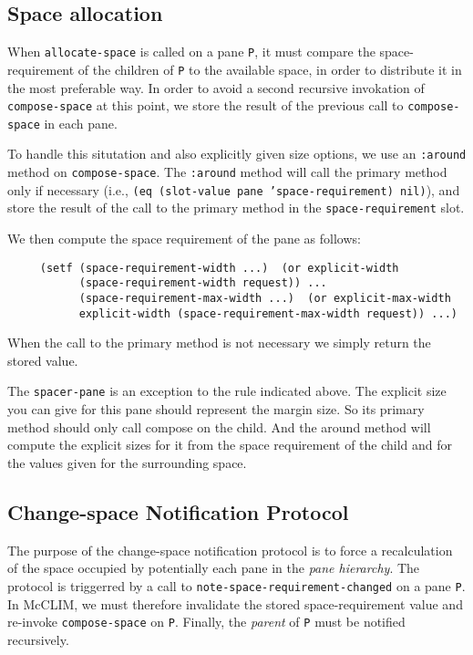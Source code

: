 \subsection{Space allocation}
\label{space-allocation}

When \texttt{allocate-space} is called on a pane \texttt{P}, it must
compare the space-requirement of the children of \texttt{P} to the
available space, in order to distribute it in the most preferable way.
In order to avoid a second recursive invokation of
\texttt{compose-space} at this point, we store the result of the
previous call to \texttt{compose-space} in each pane.

To handle this situtation and also explicitly given size options, we use
an \texttt{:around} method on \texttt{compose-space}.  The
\texttt{:around} method will call the primary method only if necessary
(i.e., \texttt{(eq (slot-value pane 'space-requirement) nil)}), and store
the result of the call to the primary method in the
\texttt{space-requirement} slot.

We then compute the space requirement of the pane as follows:

\begin{verbatim}
     (setf (space-requirement-width ...)  (or explicit-width
           (space-requirement-width request)) ...
           (space-requirement-max-width ...)  (or explicit-max-width
           explicit-width (space-requirement-max-width request)) ...)
\end{verbatim}

When the call to the primary method is not necessary we simply return
the stored value.

The \texttt{spacer-pane} is an exception to the rule indicated above.  The
explicit size you can give for this pane should represent the margin
size.  So its primary method should only call compose on the child.  And
the around method will compute the explicit sizes for it from the space
requirement of the child and for the values given for the surrounding
space.

\subsection{Change-space Notification Protocol}

The purpose of the change-space notification protocol is to force a
recalculation of the space occupied by potentially each pane in the
\emph{pane hierarchy}.  The protocol is triggerred by a call to
\texttt{note-space-requirement-changed} on a pane \texttt{P}. In McCLIM, we
must therefore invalidate the stored space-requirement value and
re-invoke \texttt{compose-space} on \texttt{P}.  Finally, the
\emph{parent} of \texttt{P} must be notified recursively.


